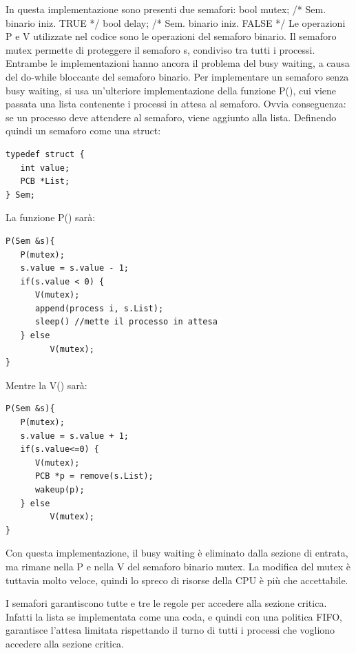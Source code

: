 \documentclass[a4paper]{article}
\begin{document}
In questa implementazione sono presenti due semafori: \newline
bool mutex; /* Sem. binario iniz. TRUE */ \newline
bool delay; /* Sem. binario iniz. FALSE */\newline
Le operazioni P e V utilizzate nel codice sono le operazioni del semaforo binario. Il semaforo mutex permette di proteggere il semaforo s, condiviso tra tutti i processi. Entrambe le implementazioni hanno ancora il problema del busy waiting, a causa del do-while bloccante del semaforo binario.
Per implementare un semaforo senza busy waiting, si usa un'ulteriore implementazione della funzione P(), cui viene passata una lista contenente i processi in attesa al semaforo. Ovvia conseguenza: se un processo deve attendere al semaforo, viene aggiunto alla lista. Definendo quindi un semaforo come una struct:
\begin{verbatim}
typedef struct {
   int value;
   PCB *List;
} Sem;
\end{verbatim}
La funzione P() sarà:
\begin{verbatim}
P(Sem &s){
   P(mutex);
   s.value = s.value - 1;
   if(s.value < 0) {
      V(mutex);
      append(process i, s.List);
      sleep() //mette il processo in attesa
   } else
         V(mutex);
}
\end{verbatim}
Mentre la V() sarà:
\begin{verbatim}
P(Sem &s){
   P(mutex);
   s.value = s.value + 1;
   if(s.value<=0) {
      V(mutex);
      PCB *p = remove(s.List);
      wakeup(p);
   } else
         V(mutex);
}
\end{verbatim}

Con questa implementazione, il busy waiting è eliminato dalla sezione di entrata, ma rimane nella P e nella V del semaforo binario mutex. La modifica del mutex è tuttavia molto veloce, quindi lo spreco di risorse della CPU è più che accettabile.

I semafori garantiscono tutte e tre le regole per accedere alla sezione critica. Infatti la lista se implementata come una coda, e quindi con una politica FIFO, garantisce l’attesa limitata rispettando il turno di tutti i processi che vogliono accedere alla sezione critica.
\end{document}

